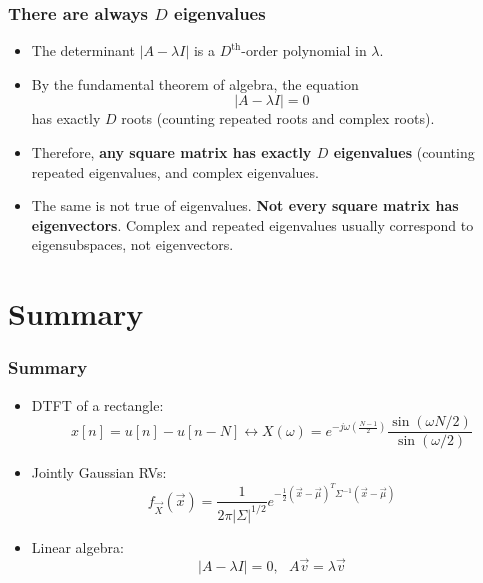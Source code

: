 \documentclass{beamer}
\begin{document}
\begin{frame}
  \frametitle{There are always $D$ eigenvalues}
  \begin{itemize}
  \item The determinant $|A-\lambda I|$ is a $D^{\textrm{th}}$-order polynomial in $\lambda$.
  \item By the fundamental theorem of algebra, the equation
    \[
    |A-\lambda I|=0
    \]
    has exactly $D$ roots (counting repeated roots and complex roots).
  \item Therefore, {\bf any square matrix has exactly $D$ eigenvalues}
    (counting repeated eigenvalues, and complex eigenvalues.
  \item The same is not true of eigenvalues.  {\bf Not every square
    matrix has eigenvectors}.  Complex and repeated eigenvalues
    usually correspond to eigensubspaces, not eigenvectors.
  \end{itemize}
\end{frame}

\section{Summary}
\begin{frame}
  \frametitle{Summary}
  \begin{itemize}
    \item DTFT of a rectangle: 
      \[
      x[n]=u[n]-u[n-N] \leftrightarrow
      X(\omega)=e^{-j\omega\left(\frac{N-1}{2}\right)}\frac{\sin(\omega N/2)}{\sin(\omega/2)}
      \]
    \item Jointly Gaussian RVs:
      \[
      f_{\vec{X}}(\vec{x}) = \frac{1}{2\pi|\Sigma|^{1/2}}
      e^{-\frac{1}{2}(\vec{x}-\vec\mu)^T\Sigma^{-1}(\vec{x}-\vec\mu)}
      \]
    \item Linear algebra:
      \[
      |A-\lambda I|=0,~~~A\vec{v}=\lambda\vec{v}
      \]
  \end{itemize}
\end{frame}
\end{document}
